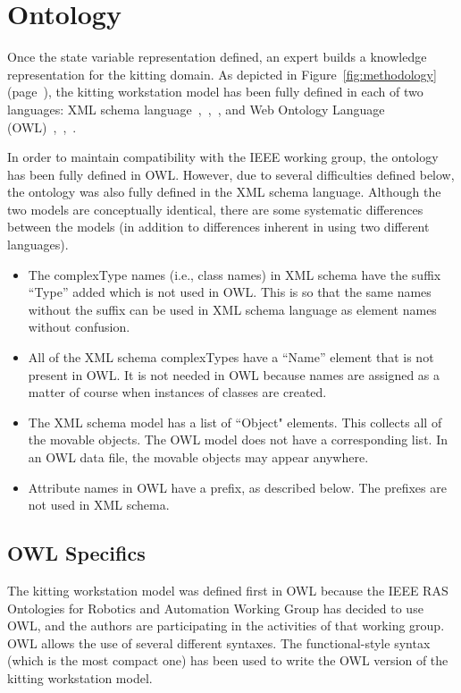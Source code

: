\section{Ontology}
Once the state variable representation defined, an expert builds a knowledge representation for the kitting domain. As depicted in Figure~\ref{fig:methodology}(page~\pageref{fig:methodology}), the kitting workstation model has been fully defined in each of two languages: XML schema language~\cite{Walmsley.2002},~\cite{XMLschemaPrimer},~\cite{XMLschemaStructures}, and Web Ontology Language (OWL)~\cite{OWLoverview},~\cite{OWLprimer},~\cite{OWLspec}.


In order to maintain compatibility with the IEEE working group,
the ontology has been fully defined in OWL. However, due to
several difficulties defined below, the ontology was also fully defined
in the XML schema language.
Although the two
models are conceptually identical, there
are some systematic differences between the models (in addition to
differences inherent in using two different languages).

\begin{itemize}
\item The complexType names (i.e., class names) in XML schema have the
  suffix ``Type'' added which is not used in OWL. This is so that the same
  names without the suffix can be used in XML schema language as element
  names without confusion.

\item All of the XML schema complexTypes have a ``Name'' element that is
  not present in OWL. It is not needed in OWL because names are assigned as
  a matter of course when instances of classes are created.

\item The XML schema model has a list of ``Object"
elements. This collects all of the movable objects. The OWL model does not
have a corresponding list. In an OWL data file, the movable objects may
appear anywhere.

\item Attribute names in OWL have a prefix, as described below. The
  prefixes are not used in XML schema.
\end{itemize}

\subsection{OWL Specifics}
The kitting workstation model was defined first in OWL because the IEEE RAS
Ontologies for Robotics and Automation Working Group has decided to use
OWL, and the authors are participating in the activities of that working
group. OWL allows the use of several different syntaxes. The
functional-style syntax (which is the most compact one) has been used to
write the OWL version of the kitting workstation model.

